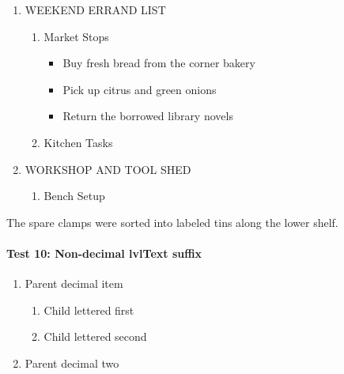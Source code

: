 \documentclass[11pt,a4paper]{article}
\begin{document}
\begin{enumerate}
\item WEEKEND ERRAND LIST
  \begin{enumerate}
\item Market Stops
    \begin{itemize}
\item Buy fresh bread from the corner bakery
\item Pick up citrus and green onions
\item Return the borrowed library novels
    \end{itemize}
\item Kitchen Tasks
  \end{enumerate}
\item WORKSHOP AND TOOL SHED
  \begin{enumerate}
\item Bench Setup
  \end{enumerate}
\end{enumerate}

The spare clamps were sorted into labeled tins along the lower shelf.

\paragraph{Test 10: Non-decimal lvlText suffix}

\begin{enumerate}
\item Parent decimal item
  \begin{enumerate}
\item Child lettered first
\item Child lettered second
  \end{enumerate}
\item Parent decimal two
\end{enumerate}
\end{document}

